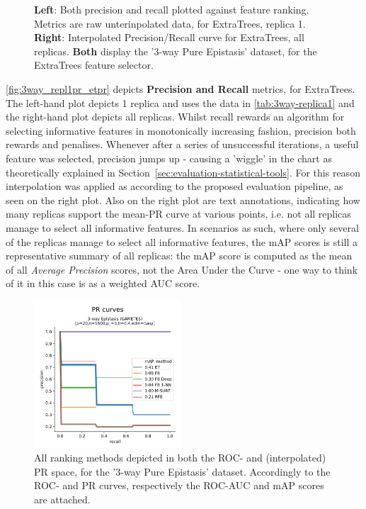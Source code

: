 \documentclass{article}
\begin{document}
\begin{figure}[ht]
\centering


\caption{\textbf{Left}: Both precision and recall plotted against feature ranking. Metrics are raw unterinpolated data, for ExtraTrees, replica 1. \textbf{Right}: Interpolated Precision/Recall curve for ExtraTrees, all replicas. \textbf{Both} display the '3-way Pure Epistasis' dataset, for the ExtraTrees feature selector. }
\label{fig:3way_repl1pr_etpr}
\end{figure}

\autoref{fig:3way_repl1pr_etpr} depicts \textbf{Precision and Recall} metrics, for ExtraTrees. The left-hand plot depicts 1 replica and uses the data in \autoref{tab:3way-replica1} and the right-hand plot depicts all replicas. Whilst recall rewards an algorithm for selecting informative features in monotonically increasing fashion, precision both rewards and penalises. Whenever after a series of unsuccessful iterations, a useful feature was selected, precision jumps up - causing a 'wiggle' in the chart as theoretically explained in Section~\ref{sec:evaluation-statistical-tools}. For this reason interpolation was applied as according to the proposed evaluation pipeline, as seen on the right plot. Also on the right plot are text annotations, indicating how many replicas support the mean-PR curve at various points, i.e. not all replicas manage to select all informative features. In scenarios as such, where only several of the replicas manage to select all informative features, the mAP scores is still a representative summary of all replicas: the mAP score is computed as the mean of all \textit{Average Precision} scores, not the Area Under the Curve - one way to think of it in this case is as a weighted AUC score.

\begin{figure}[ht]
\centering

\includegraphics[width=0.49\textwidth]{img/3way_pr.png}
\caption{All ranking methods depicted in both the ROC- and (interpolated) PR space, for the '3-way  Pure  Epistasis' dataset. Accordingly to the ROC- and PR curves, respectively the ROC-AUC and mAP scores are attached.}
\label{fig:3way_rocpr}
\end{figure}
\end{document}

